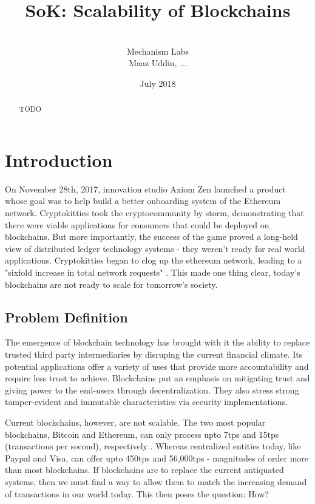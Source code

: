\documentclass{article}
\title{SoK: Scalability of Blockchains}
\author{
\\ \small{Mechanism Labs} \\ \small{Maaz Uddin, ...}}
\date{July 2018}
\begin{document}
\maketitle

\begin{abstract}
TODO
\end{abstract}

\maketitle

\section{Introduction}
On November 28th, 2017, innovation studio Axiom Zen launched a product whose goal was to help build a better onboarding system of the Ethereum network. Cryptokitties took the cryptocommunity by storm, demonstrating that there were viable applications for consumers that could be deployed on blockchains. But more importantly, the success of the game proved a long-held view of distributed ledger technology systems - they weren't ready for real world applications. Cryptokitties began to clog up the ethereum network, leading to a "sixfold increase in total network requests" \cite{ConsensysCryptokitties}. This made one thing clear, today's blockchains are not ready to scale for tomorrow's society.

\subsection{Problem Definition}
The emergence of blockchain technology has brought with it the ability to replace trusted third party intermediaries by disruping the current financial climate. Its potential applications offer a variety of uses that provide more accountability and require less trust to achieve. Blockchains put an emphasis on mitigating trust and giving power to the end-users through decentralization. They also stress strong tamper-evident and immutable characteristics via security implementations.

Current blockchains, however, are not scalable. The two most popular blockchains, Bitcoin and Ethereum, can only process upto 7tps and 15tps (transactions per second), respectively \cite{NeedCitation, ForBoth}. Whereas centralized entities today, like Paypal and Visa, can offer upto 450tps \cite{PaypalTPS} and 56,000tps \cite{VisaTPS} - magnitudes of order more than most blockchains. If blockchains are to replace the current antiquated systems, then we must find a way to allow them to match the increasing demand of transactions in our world today. This then poses the question: How?
\end{document}
